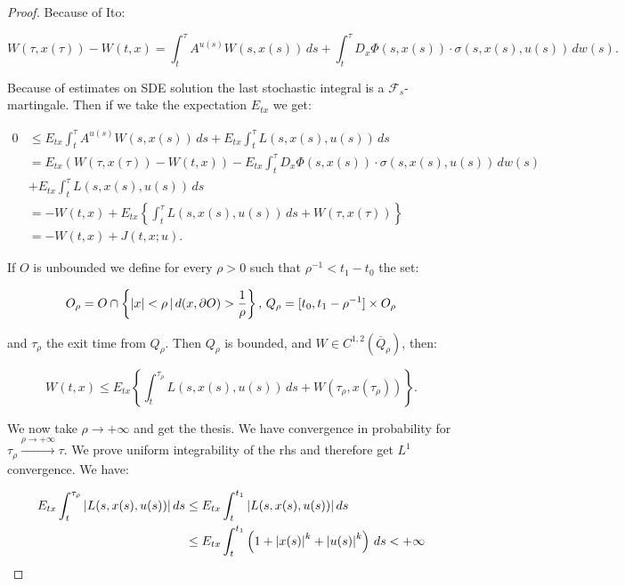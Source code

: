 \begin{theorem}
\begin{proof}
        Because of Ito:

        \begin{equation}
            W(\tau,x(\tau)) - W(t,x) = \int_t^{\tau} A^{u(s)}W(s,x(s))\,ds + \int_t^{\tau} D_x\Phi(s,x(s))\cdot \sigma(s,x(s),u(s))\,dw(s).
        \end{equation}

        Because of estimates on SDE solution the last stochastic integral is a $\mathcal{F}_s$-martingale. Then if we take the expectation $E_{tx}$ we get:

        \begin{align}
            0 & \leq E_{tx} \int_t^{\tau}A^{u(s)}W(s,x(s))\,ds + E_{tx}\int_t^{\tau} L(s,x(s),u(s))\,ds \\
            & = E_{tx}\left(W(\tau,x(\tau)) - W(t,x)\right) - E_{tx}\int_t^{\tau} D_x\Phi(s,x(s))\cdot \sigma(s,x(s),u(s))\,dw(s) \\
            & + E_{tx}\int_t^{\tau} L(s,x(s),u(s))\,ds \\
            & = -W(t,x) + E_{tx}\left\{\int_t^{\tau} L(s,x(s),u(s))\,ds + W(\tau,x(\tau))\right\} \\
            & = -W(t,x) + J(t,x;u).
        \end{align}

        If $O$ is unbounded we define for every $\rho>0$ such that $\rho^{-1}<t_1-t_0$ the set:

        \begin{equation}
            O_{\rho} = O\cap\left\{\abs{x}<\rho\,|\,d(x,\partial O)>\frac{1}{\rho}\right\},\, Q_{\rho} = [t_0,t_1-\rho^{-1}]\times O_{\rho}
        \end{equation}

        and $\tau_{\rho}$ the exit time from $Q_{\rho}$. Then $Q_{\rho}$ is bounded, and $W\in C^{1,2}(\overline{Q}_{\rho})$, then:

        \begin{equation}
            W(t,x) \leq E_{tx}\left\{\int_t^{\tau_{\rho}} L(s,x(s),u(s))\,ds + W(\tau_{\rho},x(\tau_{\rho}))\right\}.
        \end{equation}

        We now take $\rho\to+\infty$ and get the thesis. We have convergence in probability for $\tau_{\rho}\xrightarrow{\rho\to+\infty}\tau$. 
        We prove uniform integrability of the rhs and therefore get $L^1$ convergence. We have:
        
        \begin{align}
            E_{tx}\int_t^{\tau_{\rho}} \abs{L(s,x(s),u(s))}\,ds & \leq E_{tx}\int_t^{t_1}\abs{L(s,x(s),u(s))}\,ds \\
            & \leq E_{tx}\int_t^{t_1}\left(1+\abs{x(s)}^k+\abs{u(s)}^k\right)\,ds < +\infty    
        \end{align}
        

\end{proof}
\end{theorem}
